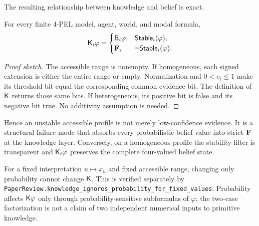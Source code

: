The resulting relationship between knowledge and belief is exact.

\begin{theorem}
For every finite 4-PEL model, agent, world, and modal formula,
\[
  \mathsf{K}_i\varphi
  =
  \begin{cases}
    \mathsf{B}_i\varphi,&\mathsf{Stable}_i(\varphi),\\
    \mathbf{F},&\neg\mathsf{Stable}_i(\varphi).
  \end{cases}
\]
\statusverified
\end{theorem}

\begin{proof}[Proof sketch]
The accessible range is nonempty. If homogeneous, each signed extension is
either the entire range or empty. Normalization and \(0<c_i\le1\) make its
threshold bit equal the corresponding common evidence bit. The definition of
\(\mathsf{K}\) returns those same bits. If heterogeneous, its positive bit is false
and its negative bit true. No additivity assumption is needed.
\end{proof}

Hence an unstable accessible profile is not merely low-confidence evidence. It is a structural failure mode that absorbs every probabilistic belief value into strict \(\mathbf{F}\) at the knowledge layer. Conversely, on a homogeneous profile the stability filter is transparent and \(\mathsf{K}_i\varphi\) preserves the complete four-valued belief state.

For a fixed interpretation \(u\mapsto x_u\) and fixed accessible range, changing
only probability cannot change \(\mathsf{K}\). This is verified separately by
\texttt{PaperReview.knowledge\_ignores\_probability\_for\_fixed\_values}.
Probability affects \(\mathsf{K}\varphi\) only through probability-sensitive
subformulas of \(\varphi\); the two-case factorization is not a claim of two
independent numerical inputs to primitive knowledge.
